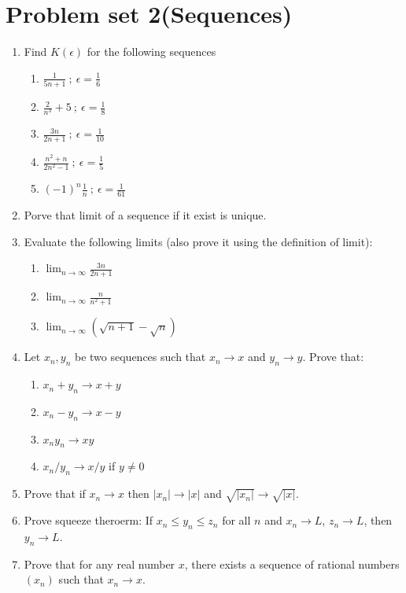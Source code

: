 \documentclass[12pt]{article}
\begin{document}
\newpage

\section{Problem set 2(Sequences)}

\begin{enumerate}
     \item Find $K(\epsilon ) $ for the following sequences 
    \begin{enumerate}
        \item $\frac{1}{5n+1} ~;~ \epsilon = \frac{1}{6} $
        \item $\frac{2}{n^3}+5 ~; ~\epsilon = \frac{1}{8}$
        \item $\frac{3n}{2n+1} ~; ~\epsilon = \frac{1}{10}$
        \item$\frac{n^2 + n }{2n^2 -1} ~; ~\epsilon = \frac{1}{5}$
        \item$(-1)^n \frac{1 }{n} ~; ~\epsilon = \frac{1}{61}$
    \end{enumerate}

    \item Porve that limit of a sequence if it exist is unique.
    \item Evaluate the following limits (also prove it using the definition of limit):
    \begin{enumerate}
        \item \( \lim_{n \to \infty} \frac{3n}{2n+1} \)
        \item \( \lim_{n \to \infty} \frac{n}{n^2 + 1} \)
        \item \( \lim_{n \to \infty} (\sqrt{n+1} - \sqrt n) \)
    \end{enumerate}
    \item Let $x_n,y_n$ be two sequences such that $x_n \to x$ and $y_n \to y$. Prove that:
    \begin{enumerate}
        \item \( x_n + y_n \to x + y \)
        \item \( x_n - y_n \to x - y \)
        \item \( x_n y_n \to xy \)
        \item \( x_n / y_n \to x/y \) if \( y \neq 0 \)
    \end{enumerate}
    \item Prove that if $x_n\to x$ then $|x_n|\to|x|$ and $\sqrt{|x_n|}\to\sqrt{|x|}$.
    \item Prove squeeze theroerm:
    If \( x_n \leq y_n \leq z_n \) for all \( n \) and \( x_n \to L \), \( z_n \to L \), then \( y_n \to L \).
    \item Prove that for any real number $x$, there exists a sequence of rational numbers $(x_n)$ such that $x_n \to x$.
\end{enumerate}
\end{document}
